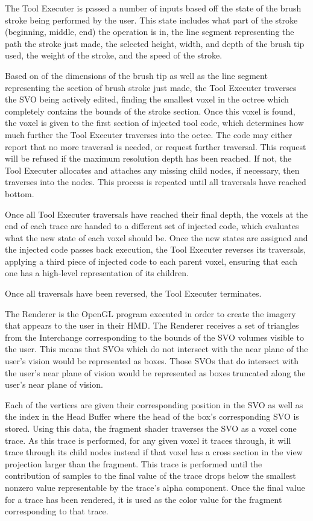 \documentclass[onecolumn, draftclsnofoot,10pt, compsoc]{IEEEtran}
\newcounter{threesection}[subsubsection]
\newcounter{foursection}[threesection]
\begin{document}
The Tool Executer is passed a number of inputs based off the state of the brush stroke being performed by the user.
This state includes what part of the stroke (beginning, middle, end) the operation is in, the line segment representing the path the stroke just made, the selected height, width, and depth of the brush tip used, the weight of the stroke, and the speed of the stroke.

Based on of the dimensions of the brush tip as well as the line segment representing the section of brush stroke just made, the Tool Executer traverses the SVO being actively edited, finding the smallest voxel in the octree which completely contains the bounds of the stroke section.
Once this voxel is found, the voxel is given to the first section of injected tool code, which determines how much further the Tool Executer traverses into the octee.
The code may either report that no more traversal is needed, or request further traversal.
This request will be refused if the maximum resolution depth has been reached.
If not, the Tool Executer allocates and attaches any missing child nodes, if necessary, then traverses into the nodes. This process is repeated until all traversals have reached bottom.

Once all Tool Executer traversals have reached their final depth, the voxels at the end of each trace are handed to a different set of injected code, which evaluates what the new state of each voxel should be.
Once the new states are assigned and the injected code passes back execution, the Tool Executer reverses its traversals, applying a third piece of injected code to each parent voxel, ensuring that each one has a high-level representation of its children.

Once all traversals have been reversed, the Tool Executer terminates.

The Renderer is the OpenGL program executed in order to create the imagery that appears to the user in their HMD.
The Renderer receives a set of triangles from the Interchange corresponding to the bounds of the SVO volumes visible to the user.
This means that SVOs which do not intersect with the near plane of the user’s vision would be represented as boxes.
Those SVOs that do intersect with the user’s near plane of vision would be represented as boxes truncated along the user’s near plane of vision.

Each of the vertices are given their corresponding position in the SVO as well as the index in the Head Buffer where the head of the box’s corresponding SVO is stored.
Using this data, the fragment shader traverses the SVO as a voxel cone trace.
As this trace is performed, for any given voxel it traces through, it will trace through its child nodes instead if that voxel has a cross section in the view projection larger than the fragment.
This trace is performed until the contribution of samples to the final value of the trace drops below the smallest nonzero value representable by the trace's alpha component.
Once the final value for a trace has been rendered, it is used as the color value for the fragment corresponding to that trace.\\
\end{document}
